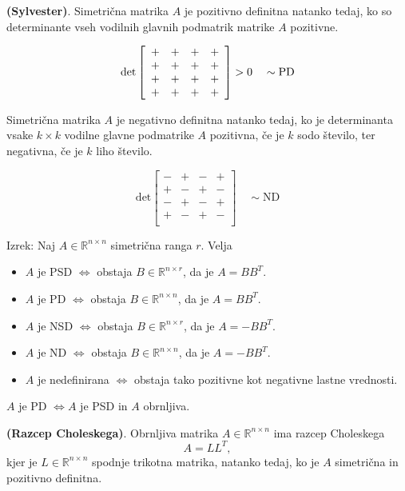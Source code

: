 \documentclass{article}
\begin{document}
\begin{multicols}{2}
\textbf{(Sylvester)}. Simetrična matrika \( A \) je pozitivno definitna natanko tedaj, ko so determinante vseh vodilnih glavnih podmatrik matrike \( A \) pozitivne.

\[
\text{det} \left[
\begin{array}{cccc}
+ & + & + & + \\
+ & + & + & + \\
+ & + & + & + \\
+ & + & + & + \\
\end{array}
\right] > 0 \quad \sim \text{PD} \\
\]

Simetrična matrika \( A \) je negativno definitna natanko tedaj, ko je determinanta vsake \( k \times k \) vodilne glavne podmatrike \( A \) pozitivna, če je \( k \) sodo število, ter negativna, če je \( k \) liho število.

\[
\text{det} \left[
\begin{array}{cccc}
- & + & - & + \\
+ & - & + & - \\
- & + & - & + \\
+ & - & + & - \\
\end{array}
\right] \quad \sim \text{ND}
\]

Izrek: Naj \( A \in \mathbb{R}^{n \times n} \) simetrična ranga \( r \). Velja
\begin{itemize}
    \item \( A \) je PSD \( \Leftrightarrow \) obstaja \( B \in \mathbb{R}^{n \times r} \), da je \( A = BB^T \).
    \item \( A \) je PD \( \Leftrightarrow \) obstaja \( B \in \mathbb{R}^{n \times n} \), da je \( A = BB^T \).
    \item \( A \) je NSD \( \Leftrightarrow \) obstaja \( B \in \mathbb{R}^{n \times r} \), da je \( A = -BB^T \).
    \item \( A \) je ND \( \Leftrightarrow \) obstaja \( B \in \mathbb{R}^{n \times n} \), da je \( A = -BB^T \).
    \item \( A \) je nedefinirana \( \Leftrightarrow \) obstaja tako pozitivne kot negativne lastne vrednosti.
\end{itemize}
\( A \) je PD \( \Leftrightarrow A \) je PSD in \( A \) obrnljiva.

\textbf{(Razcep Choleskega)}. Obrnljiva matrika \( A \in \mathbb{R}^{n \times n} \) ima razcep Choleskega
\[ A = LL^T, \]
kjer je \( L \in \mathbb{R}^{n \times n} \) spodnje trikotna matrika, natanko tedaj, ko je \( A \) simetrična in pozitivno definitna.


\end{multicols}
\end{document}
